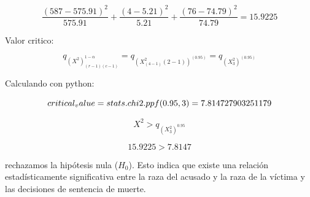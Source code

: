 \documentclass{article}
\begin{document}
\[ \frac{(587-575.91)^2}{575.91} + \frac{(4-5.21)^2}{5.21} + \frac{(76-74.79)^2}{74.79} = 15.9225\]

Valor critico:

\[
    q_{(X^2)_{(r-1)(c-1)}^{1-\alpha}} = q_{(X^2_(4-1)(2-1))^(0.95)} = q_{(X^2_3)^(0.95)} 
\]

Calculando con python:

\begin{equation}
    critical_value = stats.chi2.ppf(0.95, 3) = 7.814727903251179\\
\end{equation}

\[X^2 > q_{(X^2_3)^{0.95}}\]

\[15.9225 > 7.8147\]

rechazamos la hipótesis nula (\( H_0 \)). Esto indica que existe una relación estadísticamente significativa entre la raza del acusado y la raza de la víctima y las decisiones de sentencia de muerte.
\end{document}
